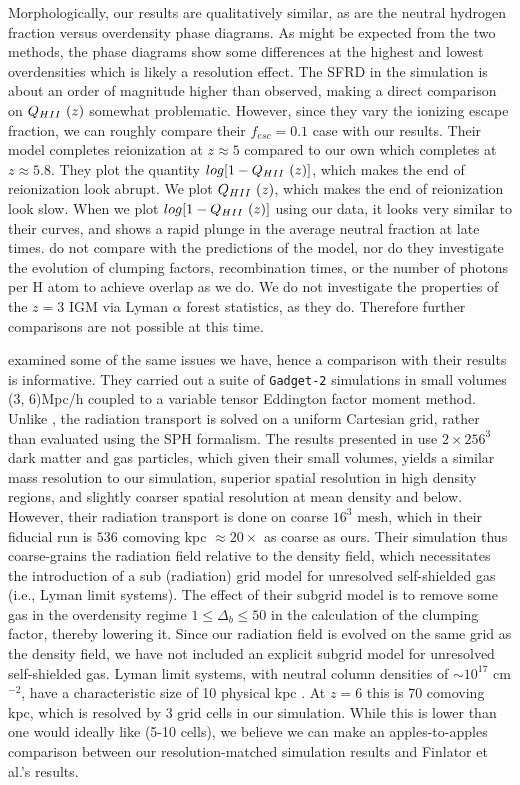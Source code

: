 Morphologically, our results are qualitatively similar, as are the neutral hydrogen fraction versus overdensity phase diagrams. As might be expected from the two methods, the phase diagrams show some differences at the highest and lowest overdensities which is likely a resolution effect. The SFRD in the \cite{PetkovaSpringel2011a} simulation is about an order of magnitude higher than observed, making a direct comparison on $Q_{\hii}(z)$ somewhat problematic. However, since they vary the ionizing escape fraction, we can roughly compare their $f_{esc}=0.1$ case with our results. Their model completes reionization at $z \approx 5$ compared to our own which completes at $z \approx 5.8$. They plot the quantity $log[1-Q_{\hii}(z)]$, which makes the end of reionization look abrupt. We plot $Q_{\hii}(z)$, which makes the end of reionization look slow. When we plot $log[1-Q_{\hii}(z)]$ using our data, it looks very similar to their curves, and shows a rapid plunge in the average neutral fraction at late times.  \cite{PetkovaSpringel2011a} do not compare with the predictions of the \cite{MadauEtAl1999} model, nor do they investigate the evolution of clumping factors, recombination times, or the number of photons per H atom to achieve overlap as we do. We do not investigate the properties of the $z=3$ IGM via Lyman $\alpha$ forest statistics, as they do. Therefore further comparisons are not possible at this time. 

\cite{FinlatorEtAl2012} examined some of the same issues we have, hence a comparison with their results is informative. They carried out a suite of {\tt Gadget-2} simulations in small volumes (3, 6)Mpc/h coupled to a variable tensor Eddington factor moment method. Unlike \cite{PetkovaSpringel2011a}, the radiation transport is solved on a uniform Cartesian grid, rather than evaluated using the SPH formalism. The results presented in \cite{FinlatorEtAl2012} use $2 \times 256^3$ dark matter and gas particles, which given their small volumes, yields a similar mass resolution to our simulation, superior spatial resolution in high density regions, and slightly coarser spatial resolution at mean density and below. However, their radiation transport is done on coarse $16^3$ mesh, which in their fiducial run is $536$ comoving kpc $\approx 20 \times$ as coarse as ours. Their simulation thus coarse-grains the radiation field relative to the density field, which necessitates the introduction of a sub (radiation) grid model for unresolved self-shielded gas (i.e., Lyman limit systems). The effect of their subgrid model is to remove some gas in the overdensity regime $1 \leq \Delta_b \leq 50$ in the calculation of the \hii clumping factor, thereby lowering it. Since our radiation field is evolved on the same grid as the density field, we have not included an explicit subgrid model for unresolved self-shielded gas. Lyman limit systems, with neutral column densities of $\sim 10^{17}$ cm$^{-2}$, have a characteristic size of 10 physical kpc \citep{Schaye2001,McQuinnEtAl2011}. At $z=6$ this is 70 comoving kpc, which is resolved by 3 grid cells in our simulation. While this is lower than one would ideally like (5-10 cells), we believe we can make an apples-to-apples comparison between our resolution-matched simulation results and Finlator et al.'s results. 

